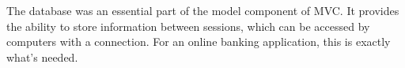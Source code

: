 
The database was an essential part of the model component of MVC. It provides the ability to store information between sessions, which can be accessed by computers with a connection. For an online banking application, this is exactly what's needed. 

